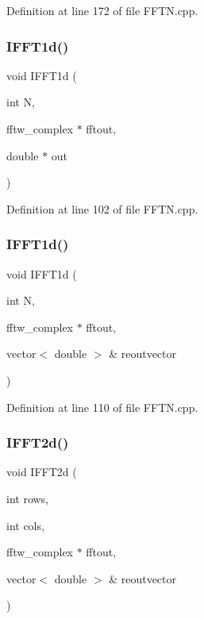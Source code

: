 Definition at line 172 of file F\+F\+T\+N.\+cpp.

\mbox{\label{FFTN_8cpp_ae5e210dd6f00da89c5579b986b9f7580_ae5e210dd6f00da89c5579b986b9f7580}} 
\subsubsection{I\+F\+F\+T1d()\hspace{0.1cm}{\footnotesize\ttfamily [1/2]}}
{\footnotesize\ttfamily void I\+F\+F\+T1d (\begin{DoxyParamCaption}\item[{int}]{N,  }\item[{fftw\+\_\+complex $\ast$}]{fftout,  }\item[{double $\ast$}]{out }\end{DoxyParamCaption})}



Definition at line 102 of file F\+F\+T\+N.\+cpp.

\mbox{\label{FFTN_8cpp_a5e3546bd07d42d7e170723bc123237d4_a5e3546bd07d42d7e170723bc123237d4}} 
\subsubsection{I\+F\+F\+T1d()\hspace{0.1cm}{\footnotesize\ttfamily [2/2]}}
{\footnotesize\ttfamily void I\+F\+F\+T1d (\begin{DoxyParamCaption}\item[{int}]{N,  }\item[{fftw\+\_\+complex $\ast$}]{fftout,  }\item[{vector$<$ double $>$ \&}]{reoutvector }\end{DoxyParamCaption})}



Definition at line 110 of file F\+F\+T\+N.\+cpp.

\mbox{\label{FFTN_8cpp_a4465313cbf2ef9d0c966c066c7e995be_a4465313cbf2ef9d0c966c066c7e995be}} 
\subsubsection{I\+F\+F\+T2d()\hspace{0.1cm}{\footnotesize\ttfamily [1/2]}}
{\footnotesize\ttfamily void I\+F\+F\+T2d (\begin{DoxyParamCaption}\item[{int}]{rows,  }\item[{int}]{cols,  }\item[{fftw\+\_\+complex $\ast$}]{fftout,  }\item[{vector$<$ double $>$ \&}]{reoutvector }\end{DoxyParamCaption})}



